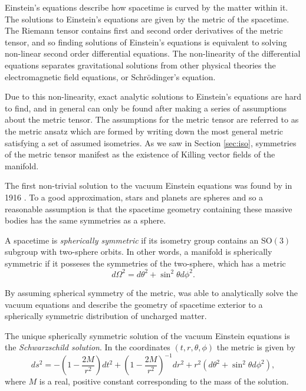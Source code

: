 Einstein's equations  describe how spacetime is curved by the matter within it. The solutions to Einstein's equations are given by the metric of the spacetime. The Riemann tensor contains first and second order derivatives of the metric tensor, and so finding solutions of Einstein's equations is equivalent to solving non-linear second order differential equations. The non-linearity of the differential equations separates gravitational solutions from other physical theories \eg the electromagnetic field equations, or Schr\"odinger's equation. 

Due to this non-linearity, exact analytic solutions to Einstein's equations are hard to find, and in general can only be found after making a series of assumptions about the metric tensor. The assumptions for the metric tensor are referred to as the metric ansatz which are formed by writing down the most general metric satisfying a set of assumed isometries. As we saw in Section \ref{sec:iso}, symmetries of the metric tensor manifest as the existence of Killing vector fields of the manifold.

The first non-trivial solution to the vacuum Einstein equations was found by \sch in 1916 \cite{Schwarzschild:1916uq}. To a good approximation, stars and planets are spheres and so a reasonable assumption is that the spacetime geometry containing these massive bodies has the same symmetries as a sphere.
\begin{defn}
A spacetime is \emph{spherically symmetric} if its isometry group contains an SO$(3)$ subgroup with two-sphere orbits. In other words, a manifold is spherically symmetric if it posseses the symmetries of the two-sphere, which has a metric
	\begin{equation*}
	d \Omega^2 = d\theta^2 + \sin^2 \theta d\phi^2		.
	\end{equation*}
\end{defn}
By assuming spherical symmetry of the metric, \sch was able to analytically solve the vacuum equations and describe the geometry of spacetime exterior to a spherically symmetric distribution of uncharged matter. 
\begin{thm}[Birkhoff]
	The unique spherically symmetric solution of the vacuum Einstein equations is the \emph{Schwarzschild solution}. In the coordinates $(t,r,\theta, \phi)$ the \sch metric is given by
	\begin{equation}
	\label{eq:schmet}
	ds^2 = -\left(1 - \frac{2M}{r^2} \right) dt^2 +	\left(1 - \frac{2M}{r^2} \right)^{-1} dr^2 + r^2(d\theta^2 + \sin^2\theta d\phi^2),
	\end{equation}
	where $M$ is a real, positive constant corresponding to the mass of the solution.
\end{thm}

